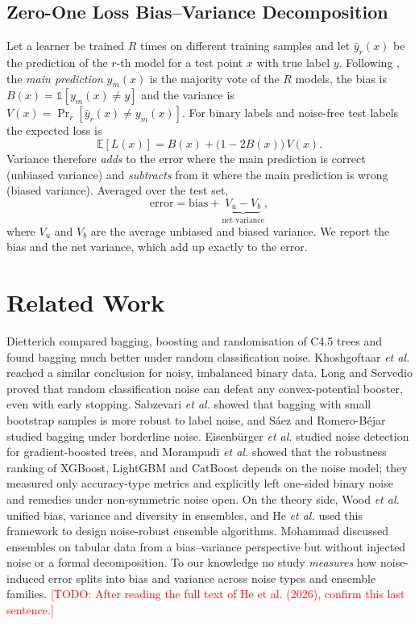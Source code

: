 \documentclass[conference,a4paper]{IEEEtran}
\newcommand{\todo}[1]{\textcolor{red}{[TODO: #1]}}
\begin{document}
\subsection{Zero-One Loss Bias--Variance Decomposition}
Let a learner be trained $R$ times on different training samples and let $\hat{y}_r(x)$ be the prediction of the $r$-th model for a test point $x$ with true label $y$. Following \cite{domingos2000}, the \emph{main prediction} $y_m(x)$ is the majority vote of the $R$ models, the bias is $B(x)=\mathbb{1}[y_m(x)\neq y]$ and the variance is $V(x)=\Pr_r[\hat{y}_r(x)\neq y_m(x)]$. For binary labels and noise-free test labels the expected loss is
\begin{equation}
\mathbb{E}[L(x)] = B(x) + \bigl(1-2B(x)\bigr)\,V(x). \label{eq:domingos}
\end{equation}
Variance therefore \emph{adds} to the error where the main prediction is correct (unbiased variance) and \emph{subtracts} from it where the main prediction is wrong (biased variance). Averaged over the test set,
\begin{equation}
\text{error} = \text{bias} + \underbrace{V_u - V_b}_{\text{net variance}},
\end{equation}
where $V_u$ and $V_b$ are the average unbiased and biased variance. We report the bias and the net variance, which add up exactly to the error.

\section{Related Work}
Dietterich \cite{dietterich2000} compared bagging, boosting and randomisation of C4.5 trees and found bagging much better under random classification noise. Khoshgoftaar \emph{et al.} \cite{khoshgoftaar2011} reached a similar conclusion for noisy, imbalanced binary data. Long and Servedio \cite{long2010} proved that random classification noise can defeat any convex-potential booster, even with early stopping. Sabzevari \emph{et al.} \cite{sabzevari2015} showed that bagging with small bootstrap samples is more robust to label noise, and S\'aez and Romero-B\'ejar \cite{saez2022} studied bagging under borderline noise. Eisenb\"urger \emph{et al.} \cite{eisenburger2024} studied noise detection for gradient-boosted trees, and Morampudi \emph{et al.} \cite{morampudi2026} showed that the robustness ranking of XGBoost, LightGBM and CatBoost depends on the noise model; they measured only accuracy-type metrics and explicitly left one-sided binary noise and remedies under non-symmetric noise open. On the theory side, Wood \emph{et al.} \cite{wood2023} unified bias, variance and diversity in ensembles, and He \emph{et al.} \cite{he2026} used this framework to design noise-robust ensemble algorithms. Mohammad \cite{mohammad2025} discussed ensembles on tabular data from a bias--variance perspective but without injected noise or a formal decomposition. To our knowledge no study \emph{measures} how noise-induced error splits into bias and variance across noise types and ensemble families.
\todo{After reading the full text of He et al. (2026), confirm this last sentence.}
\end{document}
